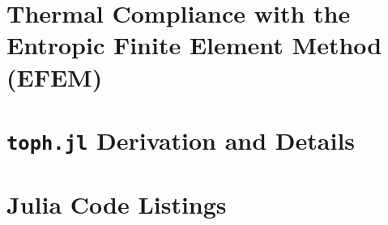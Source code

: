 \documentclass{amsart}
\begin{document}
\section{Thermal Compliance with the Entropic Finite Element Method (EFEM)}




\printbibliography

\appendix
\section{\texttt{toph.jl} Derivation and Details}


\section{Julia Code Listings}\label{sec:Julia_Listings}

\end{document}
